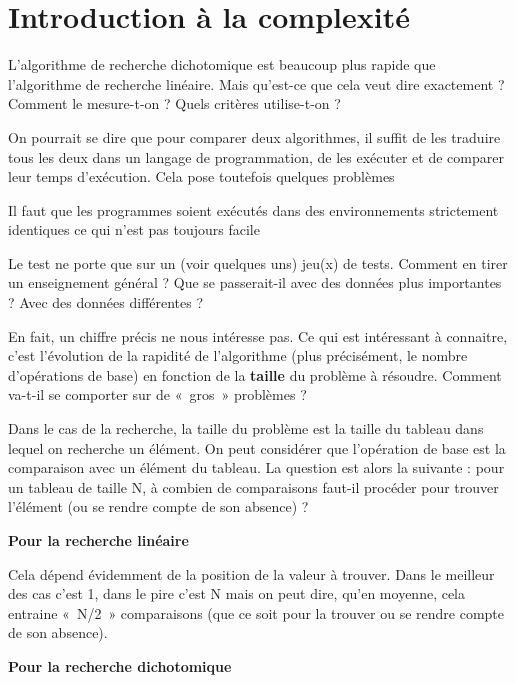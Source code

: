 \section{Introduction à la complexité}

	L’algorithme de recherche dichotomique est beaucoup plus rapide que
	l’algorithme de recherche linéaire. Mais qu’est-ce que cela veut dire
	exactement ? Comment le mesure-t-on ? Quels critères utilise-t-on ?

	On pourrait se dire que pour comparer deux algorithmes, il suffit de les
	traduire tous les deux dans un langage de programmation, de les
	exécuter et de comparer leur temps d’exécution. Cela pose toutefois
	quelques problèmes
			
	\liststyleListv
	\begin{liste}
		\item 
			Il faut que les programmes soient exécutés dans des environnements
			strictement identiques ce qui n’est pas toujours facile
		\item 
			Le test ne porte que sur un (voir quelques uns) jeu(x) de tests. Comment
			en tirer un enseignement général ? Que se passerait-il avec des données
			plus importantes ? Avec des données différentes ?
	\end{liste}
	
	En fait, un chiffre précis ne nous intéresse pas. Ce qui est intéressant
	à connaitre, c’est l’évolution de la rapidité de l’algorithme (plus
	précisément, le nombre d’opérations de base) en fonction de la
	\textbf{taille} du problème à résoudre. Comment va-t-il se comporter
	sur de «~gros~» problèmes ?

	Dans le cas de la recherche, la taille du problème est la taille du
	tableau dans lequel on recherche un élément. On peut considérer que
	l’opération de base est la comparaison avec un élément du tableau. La
	question est alors la suivante : pour un tableau de taille N, à combien
	de comparaisons faut-il procéder pour trouver l’élément (ou se rendre
	compte de son absence) ?

	{\bfseries
	Pour la recherche linéaire}

		Cela dépend évidemment de la position de la valeur à trouver. Dans le
		meilleur des cas c’est 1, dans le pire c’est N mais on peut dire, qu’en
		moyenne, cela entraine «~N/2~» comparaisons (que ce soit pour la
		trouver ou se rendre compte de son absence).

	{\bfseries
	Pour la recherche dichotomique}


